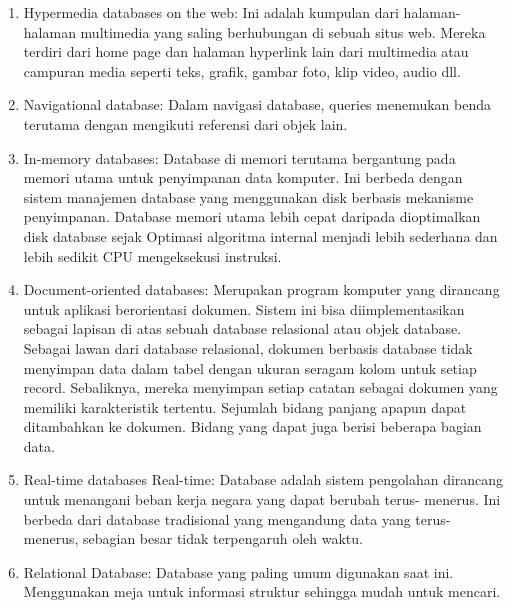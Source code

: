 \begin{enumerate}
\item Hypermedia databases on the web: Ini adalah kumpulan dari halaman-halaman multimedia yang saling berhubungan di sebuah situs web. Mereka terdiri dari home page dan halaman hyperlink lain dari multimedia atau campuran media seperti teks, grafik, gambar foto, klip video, audio dll. 
\noindent 
\item Navigational database: Dalam navigasi database, queries menemukan benda terutama dengan mengikuti referensi dari objek lain. \par
\noindent 
\item In-memory databases: Database di memori terutama bergantung pada memori utama untuk penyimpanan data komputer. Ini berbeda dengan sistem manajemen database yang menggunakan disk berbasis mekanisme penyimpanan. Database memori utama lebih cepat daripada dioptimalkan disk database sejak Optimasi algoritma internal menjadi lebih sederhana dan lebih sedikit CPU mengeksekusi instruksi. \par
\noindent 
\item Document-oriented databases: Merupakan program komputer yang dirancang untuk aplikasi berorientasi dokumen. Sistem ini bisa diimplementasikan sebagai lapisan di atas sebuah database relasional atau objek database. Sebagai lawan dari database relasional, dokumen berbasis database tidak menyimpan data dalam tabel dengan ukuran seragam kolom untuk setiap record. Sebaliknya, mereka menyimpan setiap catatan sebagai dokumen yang memiliki karakteristik tertentu. Sejumlah bidang panjang apapun dapat ditambahkan ke dokumen. Bidang yang dapat juga berisi beberapa bagian data. 
\noindent 
\item Real-time databases Real-time: Database adalah sistem pengolahan dirancang untuk menangani beban kerja negara yang dapat berubah terus- menerus. Ini berbeda dari database tradisional yang mengandung data yang terus- menerus, sebagian besar tidak terpengaruh oleh waktu. 
\noindent 
\item Relational Database: Database yang paling umum digunakan saat ini. Menggunakan meja untuk informasi struktur sehingga mudah untuk mencari.\end{enumerate}
 
